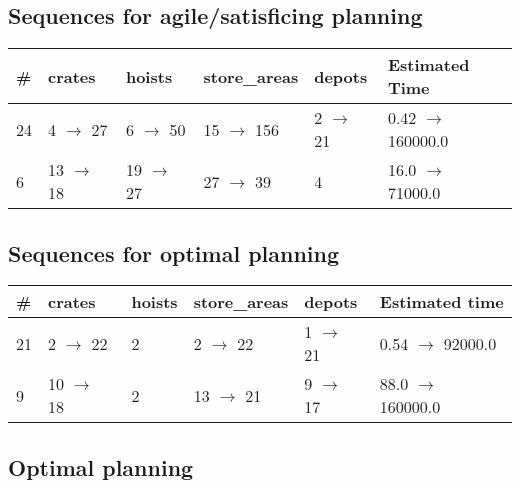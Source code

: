 \documentclass{article}
\begin{document}
                         \subsection*{Sequences for agile/satisficing planning}

                        \begin{center}
                        \begin{tabular}{@{}l|l|l|l|l|l@{}}
                        \# & crates & hoists & store\_areas & depots & Estimated Time\\\midrule
                        24&4 $\rightarrow$ 27&6 $\rightarrow$ 50&15 $\rightarrow$ 156&2 $\rightarrow$ 21&0.42 $\rightarrow$ 160000.0\\
6&13 $\rightarrow$ 18&19 $\rightarrow$ 27&27 $\rightarrow$ 39&4&16.0 $\rightarrow$ 71000.0
                        \end{tabular}
                        \end{center}
                    
                            \subsection*{Sequences for optimal planning}

                            \begin{center}
                            \begin{tabular}{@{}l|l|l|l|l|l@{}}
                            \# & crates & hoists & store\_areas & depots & Estimated time\\\midrule
                            21&2 $\rightarrow$ 22&2&2 $\rightarrow$ 22&1 $\rightarrow$ 21&0.54 $\rightarrow$ 92000.0\\
9&10 $\rightarrow$ 18&2&13 $\rightarrow$ 21&9 $\rightarrow$ 17&88.0 $\rightarrow$ 160000.0
                            \end{tabular}
                            \end{center}
                    
                                \subsection*{Optimal planning}
                                
\end{document}
